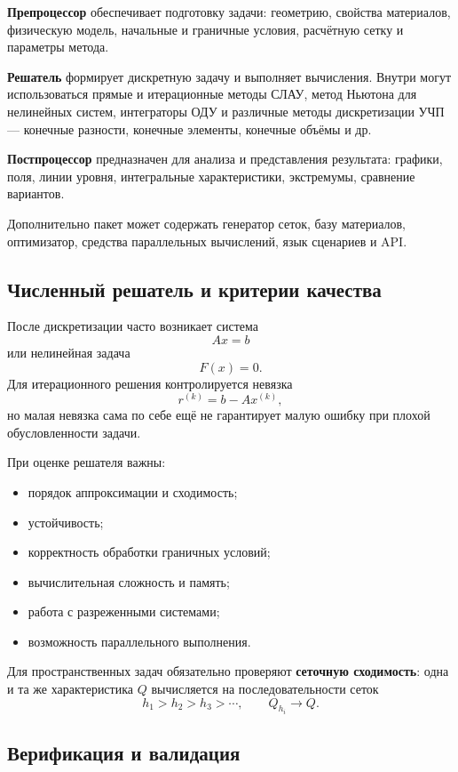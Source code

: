 \textbf{Препроцессор} обеспечивает подготовку задачи: геометрию, свойства материалов, физическую модель, начальные и граничные условия, расчётную сетку и параметры метода.

\textbf{Решатель} формирует дискретную задачу и выполняет вычисления. Внутри могут использоваться прямые и итерационные методы СЛАУ, метод Ньютона для нелинейных систем, интеграторы ОДУ и различные методы дискретизации УЧП --- конечные разности, конечные элементы, конечные объёмы и др.

\textbf{Постпроцессор} предназначен для анализа и представления результата: графики, поля, линии уровня, интегральные характеристики, экстремумы, сравнение вариантов.

Дополнительно пакет может содержать генератор сеток, базу материалов, оптимизатор, средства параллельных вычислений, язык сценариев и API.

\subsection{Численный решатель и критерии качества}

После дискретизации часто возникает система
\[
Ax=b
\]
или нелинейная задача
\[
F(x)=0.
\]
Для итерационного решения контролируется невязка
\[
r^{(k)}=b-Ax^{(k)},
\]
но малая невязка сама по себе ещё не гарантирует малую ошибку при плохой обусловленности задачи.

При оценке решателя важны:
\begin{itemize}
\item порядок аппроксимации и сходимость;
\item устойчивость;
\item корректность обработки граничных условий;
\item вычислительная сложность и память;
\item работа с разреженными системами;
\item возможность параллельного выполнения.
\end{itemize}

Для пространственных задач обязательно проверяют \textbf{сеточную сходимость}: одна и та же характеристика $Q$ вычисляется на последовательности сеток
\[
h_1>h_2>h_3>\cdots,
\qquad Q_{h_i}\rightarrow Q.
\]

\subsection{Верификация и валидация}

